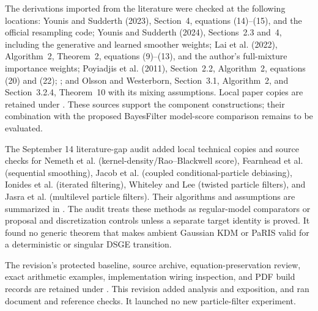 \documentclass[11pt]{article}
\begin{document}
The derivations imported from the literature were checked at the following
locations: Younis and Sudderth (2023), Section~4, equations (14)--(15), and
the official resampling code; Younis and Sudderth (2024), Sections~2.3 and~4,
including the generative and learned smoother weights; Lai et al. (2022),
Algorithm~2, Theorem~2, equations (9)--(13), and the author's full-mixture
importance weights; Poyiadjis et al. (2011), Section~2.2, Algorithm~2,
equations (20) and (22); \citet[Section~4.2, equations (24)--(25)]{scibior2021dpf};
and Olsson and Westerborn, Section~3.1, Algorithm~2, and Section~3.2.4,
Theorem~10 with its mixing assumptions. Local paper copies are retained under
. These sources support the component
constructions; their combination with the proposed BayesFilter model-score
comparison remains to be evaluated.

The September 14 literature-gap audit added local technical copies and source
checks for Nemeth et al. (kernel-density/Rao--Blackwell score), Fearnhead et
al. (sequential smoothing), Jacob et al. (coupled conditional-particle
debiasing), Ionides et al. (iterated filtering), Whiteley and Lee (twisted
particle filters), and Jasra et al. (multilevel particle filters). Their
algorithms and assumptions are summarized in
.
The audit treats these methods as regular-model comparators or proposal and
discretization controls unless a separate target identity is proved. It found
no generic theorem that makes ambient Gaussian KDM or PaRIS valid for a
deterministic or singular DSGE transition.

The revision's protected baseline, source archive, equation-preservation
review, exact arithmetic examples, implementation wiring inspection, and
PDF build records are retained under
.
This revision added analysis and exposition, and ran document and reference
checks. It launched no new particle-filter experiment.


\clearpage


\end{document}
